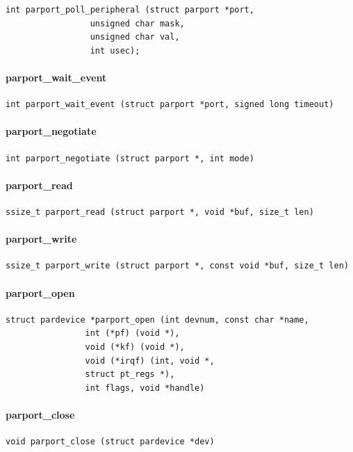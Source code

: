 \documentclass[a4paper,11pt]{article}
\begin{document}
\begin{verbatim}
int parport_poll_peripheral (struct parport *port,
			     unsigned char mask,
			     unsigned char val,
			     int usec);
\end{verbatim}


\paragraph{parport\_wait\_event}
\begin{verbatim}
int parport_wait_event (struct parport *port, signed long timeout)
\end{verbatim}


\paragraph{parport\_negotiate}
\begin{verbatim}
int parport_negotiate (struct parport *, int mode)
\end{verbatim}

\paragraph{parport\_read}
\begin{verbatim}
ssize_t parport_read (struct parport *, void *buf, size_t len)
\end{verbatim}

\paragraph{parport\_write}
\begin{verbatim}
ssize_t parport_write (struct parport *, const void *buf, size_t len)
\end{verbatim}


\paragraph{parport\_open}
\begin{verbatim}
struct pardevice *parport_open (int devnum, const char *name,
				int (*pf) (void *),
				void (*kf) (void *),
				void (*irqf) (int, void *,
				struct pt_regs *),
				int flags, void *handle)
\end{verbatim}


\paragraph{parport\_close}
\begin{verbatim}
void parport_close (struct pardevice *dev)
\end{verbatim}
\end{document}
